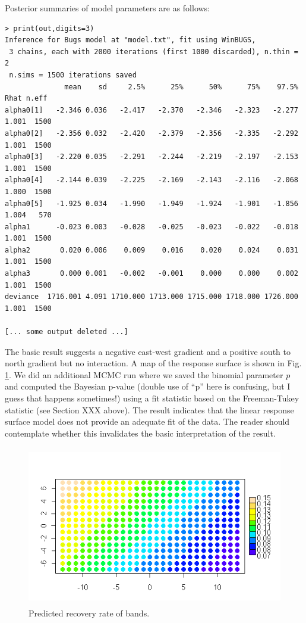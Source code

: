 Posterior summaries of model parameters are as follows:
{\small
\begin{verbatim}
> print(out,digits=3)
Inference for Bugs model at "model.txt", fit using WinBUGS,
 3 chains, each with 2000 iterations (first 1000 discarded), n.thin = 2
 n.sims = 1500 iterations saved
              mean    sd     2.5%      25%      50%      75%    97.5%  Rhat n.eff
alpha0[1]   -2.346 0.036   -2.417   -2.370   -2.346   -2.323   -2.277 1.001  1500
alpha0[2]   -2.356 0.032   -2.420   -2.379   -2.356   -2.335   -2.292 1.001  1500
alpha0[3]   -2.220 0.035   -2.291   -2.244   -2.219   -2.197   -2.153 1.001  1500
alpha0[4]   -2.144 0.039   -2.225   -2.169   -2.143   -2.116   -2.068 1.000  1500
alpha0[5]   -1.925 0.034   -1.990   -1.949   -1.924   -1.901   -1.856 1.004   570
alpha1      -0.023 0.003   -0.028   -0.025   -0.023   -0.022   -0.018 1.001  1500
alpha2       0.020 0.006    0.009    0.016    0.020    0.024    0.031 1.001  1500
alpha3       0.000 0.001   -0.002   -0.001    0.000    0.000    0.002 1.001  1500
deviance  1716.001 4.091 1710.000 1713.000 1715.000 1718.000 1726.000 1.001  1500

[... some output deleted ...]
\end{verbatim}
}

The basic result suggests a negative east-west gradient and a positive
south to north gradient but no interaction. A map of the response
surface is shown in Fig. \ref{glms.fig.bandrecovery}.
 We did an additional MCMC run where we saved the binomial
parameter $p$ and computed the Bayesian p-value (double use of ``p''
here is confusing, but I guess that happens sometimes!)
using a fit statistic based on the Freeman-Tukey
statistic (see Section XXX above). The result indicates that the
linear response surface model does not provide an adequate fit of the
data. The reader should contemplate whether this invalidates the basic
interpretation of the result.


\begin{figure}
\begin{center}
\includegraphics[height=2.75in]{Ch2/figs/responsesurface}
\end{center}
\caption{Predicted recovery rate of bands.}
\label{glms.fig.bandrecovery}
\end{figure}

